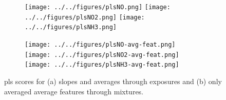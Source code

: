 \begin{figure}[!htb]
	\centering
	
	\begin{subfigure}[b]{1\textwidth}
		\texttt{[image: ../../figures/plsNO.png]}
		\hfill
		\texttt{[image: ../../figures/plsNO2.png]}
		\hfill
		\texttt{[image: ../../figures/plsNH3.png]}
		\caption{}
		\label{fig:pls}
	\end{subfigure}
	
	\begin{subfigure}[b]{1\textwidth}
		\texttt{[image: ../../figures/plsNO-avg-feat.png]}
		\hfill
		\texttt{[image: ../../figures/plsNO2-avg-feat.png]}
		\hfill
		\texttt{[image: ../../figures/plsNH3-avg-feat.png]}
		\caption{}
		\label{fig:pls-avg-only}
	\end{subfigure}
	
	\caption{\acrshort{pls} scores for (a) slopes and averages through exposures and (b) only averaged average features through mixtures.}
	\label{fig:pls-both}
\end{figure}

